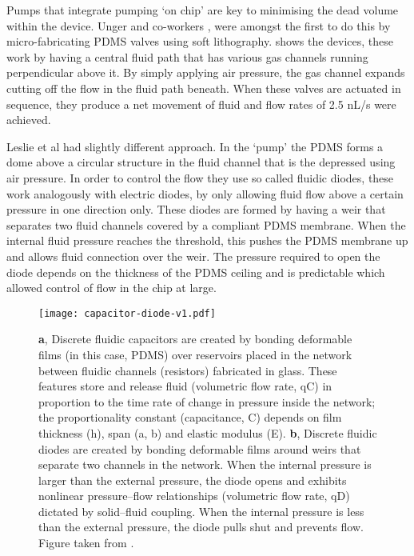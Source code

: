 Pumps that integrate pumping ‘on chip’ are key to minimising the dead volume within the device.
Unger and co-workers \citep{RN59}, were amongst the first to do this by micro-fabricating PDMS valves
using soft lithography.  shows the devices, these work by having a central fluid path that has various gas
channels running perpendicular above it. By simply applying air pressure, the gas channel expands cutting off
the flow in the fluid path beneath. When these valves are actuated in sequence, they produce a
net movement of fluid and flow rates of 2.5 nL/s were achieved.

Leslie et al \citep{RN100} had slightly different
approach. In the ‘pump’ the PDMS forms
a dome above a circular structure in the fluid channel that is the depressed using air
pressure. In order to control the flow they use so called fluidic diodes, these work
analogously with electric diodes, by only allowing fluid flow above a certain pressure in
one direction only. These diodes are formed by having a weir that separates two fluid
channels covered by a compliant PDMS membrane. When the internal fluid pressure reaches the
threshold, this pushes the PDMS membrane up and allows fluid connection over the weir. The
pressure required to open the diode depends on the thickness of the PDMS ceiling and is
predictable which allowed control of flow in the chip at large.

\begin{figure}
\begin{center}
  \texttt{[image: capacitor-diode-v1.pdf]}
\end{center}
  \caption{\textbf{a}, Discrete fluidic capacitors are created by bonding deformable films (in
   this case, PDMS) over reservoirs placed in the network between fluidic channels (resistors)
    fabricated in glass. These features store and release fluid (volumetric flow rate, qC) in
    proportion to the time rate of change in pressure inside the network; the proportionality
    constant (capacitance, C) depends on film thickness (h), span (a, b) and elastic modulus
    (E). \textbf{b}, Discrete fluidic diodes are created by bonding deformable films around
    weirs that separate two channels in the network. When the internal pressure is larger than
    the external pressure, the diode opens and exhibits nonlinear pressure–flow relationships
    (volumetric flow rate, qD) dictated by solid–fluid coupling. When the internal pressure is
    less than the external pressure, the diode pulls shut and prevents flow. Figure taken from
    \citep{RN100}.}
  \label{fig:Leslie-valves}
\end{figure}

